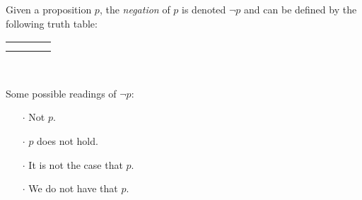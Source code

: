 \begin{definition}[Negation]
    \begin{center}
        \begin{minipage}[t]{.55\linewidth}
            Given a proposition \(p\), the \emph{negation} of \(p\)
            is denoted \(\neg p\) and can be defined by the following truth table:
            \begin{table}[H]
                \centering
                \label{tab:not}
                \begin{tabular}{|Cc||Cc|} \hline
                     &  \\ \hline
                    \thead{\(\top\)} &  \\
                    \thead{\(\bot\)} &  \\ \hline
                \end{tabular}
            \end{table}
        \end{minipage}%
        \begin{minipage}[t]{.05\linewidth}
            ~
        \end{minipage}%
        \begin{minipage}[t]{.4\linewidth}
            Some possible readings of \(\neg p\):\\
            \begin{itemize}
                \item[\(\cdot\)]
                    Not \(p\).
                \item[\(\cdot\)]
                    \(p\) does not hold.
                \item[\(\cdot\)]
                    It is not the case that \(p\).
                \item[\(\cdot\)]
                    We do not have that \(p\).
            \end{itemize}
        \end{minipage}
    \end{center}
\end{definition}

